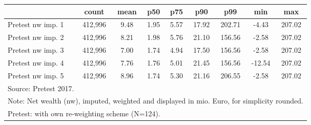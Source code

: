{
\def\sym#1{\ifmmode^{#1}\else\(^{#1}\)\fi}
\begin{tabular}{l*{1}{cccccccc}}
\hline\hline
                                            &       count&        mean&         p50&         p75&         p90&         p99&         min&         max\\
\hline
Pretest nw imp. 1                           &     412,996&        9.48&        1.95&        5.57&       17.92&      202.71&       -4.43&      207.02\\
Pretest nw imp. 2                           &     412,996&        8.21&        1.98&        5.76&       21.10&      156.56&       -2.58&      207.02\\
Pretest nw imp. 3                           &     412,996&        7.00&        1.74&        4.94&       17.50&      156.56&       -2.58&      207.02\\
Pretest nw imp. 4                           &     412,996&        7.76&        1.76&        5.01&       21.45&      156.56&      -12.54&      207.02\\
Pretest nw imp. 5                           &     412,996&        8.96&        1.74&        5.30&       21.16&      206.55&       -2.58&      207.02\\
\hline\hline
\multicolumn{9}{l}{\footnotesize Source: Pretest 2017.}\\
\multicolumn{9}{l}{\footnotesize Note: Net wealth (nw), imputed, weighted and displayed in mio. Euro, for simplicity rounded.}\\
\multicolumn{9}{l}{\footnotesize Pretest: with own re-weighting scheme (N=124).}\\
\end{tabular}
}

